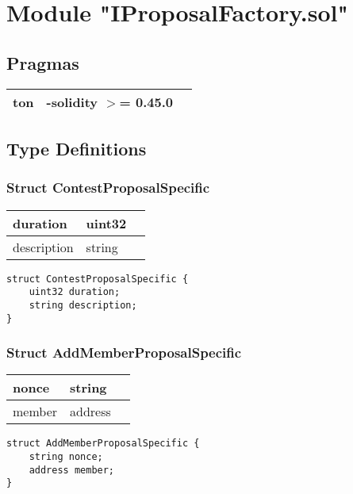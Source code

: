 
\section{Module "IProposalFactory.sol"}


\subsection{Pragmas}


\noindent\begin{tabular}{|l|l|p{5cm}|}\hline
ton & -solidity $>$= 0.45.0 &\\\hline
\end{tabular}


\subsection{Type Definitions}


\subsubsection{Struct ContestProposalSpecific}


\ifsoltables
\noindent\begin{tabular}{|l|l|p{6cm}|}\hline
duration & uint32 & \\\hline
description & string & \\\hline
\end{tabular}
\fi


\begin{lstlisting}[firstnumber=3]
struct ContestProposalSpecific {
    uint32 duration;
    string description;
}
\end{lstlisting}

\subsubsection{Struct AddMemberProposalSpecific}


\ifsoltables
\noindent\begin{tabular}{|l|l|p{6cm}|}\hline
nonce & string & \\\hline
member & address & \\\hline
\end{tabular}
\fi


\begin{lstlisting}[firstnumber=7]
struct AddMemberProposalSpecific {
    string nonce;
    address member;
}
\end{lstlisting}

